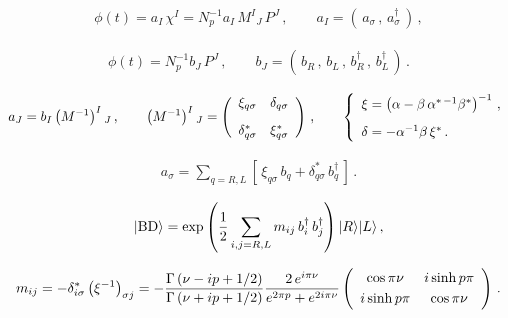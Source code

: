 \begin{eqnarray}
\phi(t)=a_I\,\chi^I=N_p^{-1}a_I\,M^I{}_J\,P^J\,,\qquad
a_I=\left(\,a_\sigma\,,\,a_\sigma^\dagger\,\right)\,,
\label{phi2}
\end{eqnarray}



\begin{eqnarray}
\phi(t)=N_p^{-1}b_J\,P^J\,,\qquad
b_J=\left(\,b_R\,,\,b_L\,,\,b_R^\dagger\,,\, b_L^\dagger\,\right)\,.
\label{phi3}
\end{eqnarray}


\begin{eqnarray}
a_J=b_I\left(M^{-1}\right)^I{}_J\,,\qquad
\left(M^{-1}\right)^I{}_J=\left(
\begin{array}{ll}
\xi_{q\sigma} & \delta_{q\sigma} \vspace{3mm}\\
\delta_{q\sigma}^* & \xi_{q\sigma}^* \\
\end{array}\right)\,,\qquad
\left\{
\begin{array}{l}
\xi=
\left(\alpha-\beta\,\alpha^{*\,-1}\beta^*\right)^{-1}\,,\vspace{3mm}\\
\delta=-\alpha^{-1}\beta\,\xi^*\,.
\end{array}
\right.
\label{xidelta1}
\end{eqnarray}


\begin{eqnarray}
a_\sigma=\sum_{q=R,L}\left[\,\xi_{q\sigma}\,b_q+\delta_{q\sigma}^*\,b_q^\dagger\,\right]\,.
\label{ab}
\end{eqnarray}


\begin{eqnarray}
|{\rm BD}\rangle = \exp\left(\frac{1}{2}\sum_{i,j=R,L}m_{ij}\,b_i^\dagger\, b_j^\dagger\right) |R\rangle|L\rangle\,,
\label{bogoliubov1}
\end{eqnarray}

\begin{eqnarray}
m_{ij}=-\delta_{i\sigma}^*\left(\xi^{-1}\right)_{\sigma j}
=-\frac{\Gamma\left(\nu-ip+1/2\right)}{\Gamma\left(\nu+ip+1/2\right)}
\frac{2\,e^{i\pi\nu}}{e^{2\pi p}+e^{2i\pi\nu}}
\left(
\begin{array}{cc}
\cos \pi\nu & i\sinh p\pi \vspace{1mm}\\
i\sinh p\pi & \cos \pi\nu \\
\end{array}
\right)\,.
\label{mij1}
\end{eqnarray}


